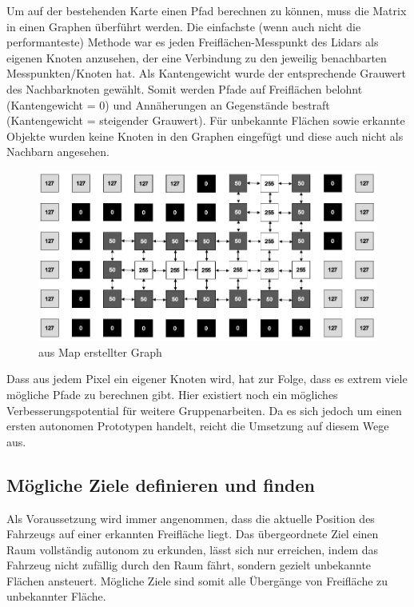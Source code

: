 Um auf der bestehenden Karte einen Pfad berechnen zu können, muss die Matrix in einen Graphen überführt werden. Die einfachste (wenn auch nicht die performanteste) Methode war es jeden Freiflächen-Messpunkt des Lidars als eigenen Knoten anzusehen, der eine Verbindung zu den jeweilig benachbarten Messpunkten/Knoten hat. Als Kantengewicht wurde der entsprechende Grauwert des Nachbarknoten gewählt. Somit werden Pfade auf Freiflächen belohnt (Kantengewicht = 0) und Annäherungen an Gegenstände bestraft (Kantengewicht = steigender Grauwert). 
Für unbekannte Flächen sowie erkannte Objekte wurden keine Knoten in den Graphen eingefügt und diese auch nicht als Nachbarn angesehen. 

\vspace{0.5cm}
\begin{figure}[h]
\begin{center}
\includegraphics[width=15cm]{images/chapter5/GraphKnoten.JPG}
\caption{aus Map erstellter Graph}
\label{Map_aus_Graph}
\end{center}
\end{figure}


Dass aus jedem Pixel ein eigener Knoten wird, hat zur Folge, dass es extrem viele mögliche Pfade zu berechnen gibt. Hier existiert noch ein mögliches Verbesserungspotential für weitere Gruppenarbeiten. Da es sich jedoch um einen ersten autonomen Prototypen handelt, reicht die Umsetzung auf diesem Wege aus.




\subsection{Mögliche Ziele definieren und finden}
\label{sec:ziele}

Als Voraussetzung wird immer angenommen, dass die aktuelle Position des Fahrzeugs auf einer erkannten Freifläche liegt. Das übergeordnete Ziel einen Raum vollständig autonom zu erkunden, lässt sich nur erreichen, indem das Fahrzeug nicht zufällig durch den Raum fährt, sondern gezielt unbekannte Flächen ansteuert. Mögliche Ziele sind somit alle Übergänge von Freifläche zu unbekannter Fläche. 

